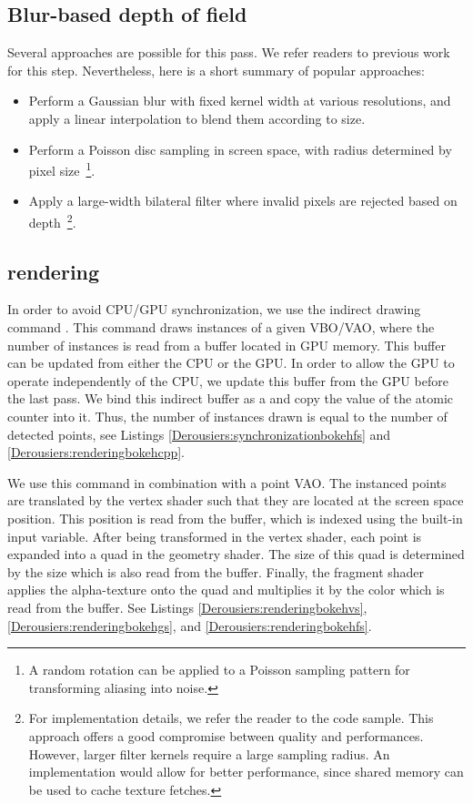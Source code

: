 \subsection{Blur-based depth of field}
Several approaches are possible for this pass. We refer readers to previous work for this step. Nevertheless, here is a short summary of popular approaches:
\begin{itemize}
	\item Perform a Gaussian blur with fixed kernel width at various resolutions, and apply a linear interpolation to blend them according to \coc size.
	\item Perform a Poisson disc sampling in screen space, with radius determined by pixel \coc size~\footnote{A random rotation can be applied to a Poisson sampling pattern for transforming aliasing into noise.}.
	\item Apply a large-width bilateral filter where invalid pixels are rejected based on depth~\footnote{For implementation details, we refer the reader to the code sample. This approach offers a good compromise between quality and performances. However, larger filter kernels require a large sampling radius. An \opencl implementation would allow for better performance, since shared memory can be used to cache texture fetches.}.
\end{itemize}


\subsection{\Bokeh rendering}
In order to avoid CPU/GPU synchronization, we use the indirect drawing command . This command draws instances of a given VBO/VAO, where the number of instances is read from a buffer located in GPU memory. This buffer can be updated from either the CPU or the GPU. In order to allow the GPU to operate independently of the CPU, we update this buffer from the GPU before the last pass. We bind this indirect buffer as a  and copy the value of the atomic counter into it. Thus, the number of instances drawn is equal to the number of detected \bokeh points, see Listings \ref{Derousiers:synchronizationbokehfs} and \ref{Derousiers:renderingbokehcpp}.

We use this command in combination with a point VAO. The instanced points are translated by the vertex shader such that they are located at the screen space \bokeh position. This position is read from the  buffer, which is indexed using the built-in  input variable. After being transformed in the vertex shader, each point is expanded into a quad in the geometry shader. The size of this quad is determined by the \bokeh size which is also read from the  buffer. Finally, the fragment shader applies the \bokeh alpha-texture onto the quad and multiplies it by the \bokeh color which is read from the  buffer. See Listings \ref{Derousiers:renderingbokehvs}, \ref{Derousiers:renderingbokehgs}, and \ref{Derousiers:renderingbokehfs}.

